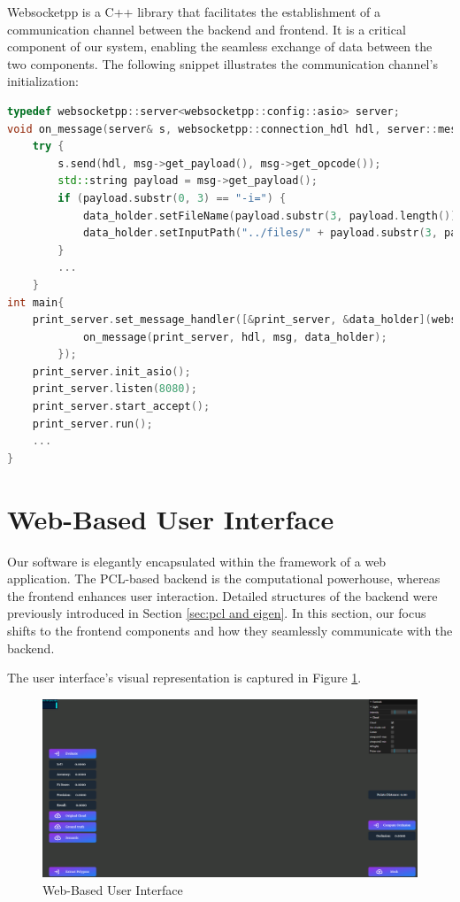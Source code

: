 \documentclass[11pt, a4paper,oneside,chapterprefix=false]{scrbook}
\begin{document}
Websocketpp is a C++ library that facilitates the establishment of a communication channel between the backend and frontend. It is a critical component of our system, enabling the seamless exchange of data between the two components. The following snippet illustrates the communication channel's initialization:

\begin{lstlisting}[language=C++, caption=Websocket Server]
typedef websocketpp::server<websocketpp::config::asio> server;
void on_message(server& s, websocketpp::connection_hdl hdl, server::message_ptr msg, DataHolder& data_holder) {
	try {
		s.send(hdl, msg->get_payload(), msg->get_opcode());
		std::string payload = msg->get_payload();
		if (payload.substr(0, 3) == "-i=") {
			data_holder.setFileName(payload.substr(3, payload.length()));
			data_holder.setInputPath("../files/" + payload.substr(3, payload.length()));
		}
		...
	}
int main{
	print_server.set_message_handler([&print_server, &data_holder](websocketpp::connection_hdl hdl, server::message_ptr msg) {
            on_message(print_server, hdl, msg, data_holder);
        });
	print_server.init_asio();
	print_server.listen(8080);
	print_server.start_accept();
	print_server.run();
	...	
}
\end{lstlisting}


\section{Web-Based User Interface} \label{sec:three.js}

Our software is elegantly encapsulated within the framework of a web application. The PCL-based backend is the computational powerhouse, whereas the frontend enhances user interaction. Detailed structures of the backend were previously introduced in Section \ref{sec:pcl and eigen}. In this section, our focus shifts to the frontend components and how they seamlessly communicate with the backend.

The user interface's visual representation is captured in Figure \ref{fig:web user interface}.

\begin{figure}[H]
	\centering
	\includegraphics*[width=1.0\textwidth]{figures/ui.png}
	\caption{Web-Based User Interface}
	\label{fig:web user interface}
\end{figure}
\end{document}
